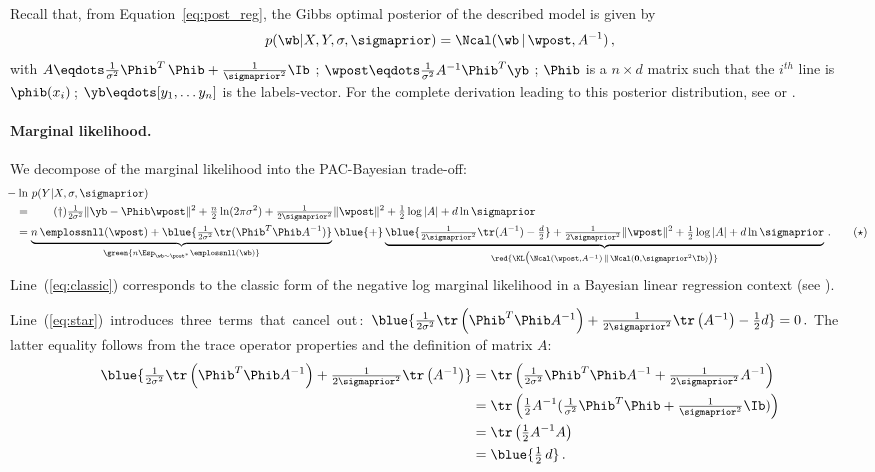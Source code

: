 \documentclass{article}
\theoremstyle{definition}
\theoremstyle{plain}
\newcommand{\citetA}{\citet}
\begin{document}
%
Recall that, from Equation~\eqref{eq:post_reg}, the Gibbs optimal posterior of the described model is given by 
$$p(\wb|X,Y,\sigma, \sigmaprior)  =\Ncal(\wb\,|\,\wpost, A^{-1})\,,$$
with
$A\eqdots\frac1{\sigma^2}\Phib^T\,\Phib+\frac1{\sigmaprior^2}\Ib$
;  $\wpost\eqdots\frac1{\sigma^2}A^{-1}\Phib^T \yb$ 
;  $\Phib$ is a $n{\times} d$ matrix such that the $i^{th}$ line is~$\phib(x_i)$\,; 
$\yb \eqdots [y_1, \ldots y_n]$ is the labels-vector. For the complete derivation leading to this posterior distribution, see \citet[Section~3.3]{bishop-2006} or \citetA[Section~2.1.1]{rasmussen-06-book}. 
 
 \paragraph{Marginal likelihood.}
 We decompose of the marginal likelihood into the PAC-Bayesian trade-off:
\begin{align}
&\!\!\!\!-\ln \,p(Y|X,\sigma, \sigmaprior) \nonumber \\ 
%
&\ = \tag{$\dagger$}\label{eq:classic}
\tfrac1{2\sigma^2}\|\yb-\Phib\wpost\|^2
+\tfrac n 2\ln(2\pi \sigma^2)
+ 
\tfrac1{2\sigmaprior^2}\|\wpost\|^2
+ \tfrac12 \log|A|
+ d\ln\sigmaprior \\
&\ =
\underbrace{
	n\,\emplossnll(\wpost)
	+   \blue{  \tfrac{1}{2 \sigma^2}  \tr ( \Phib^T \Phib A^{-1}) }
}_{\green{n\Esp_{\wb\sim\post^*}\emplossnll(\wb)} }
\blue{+} 
\underbrace{
	\blue{\tfrac1{2\sigmaprior^2}\tr(A^{-1})
	- \tfrac d2}
	+ \tfrac1{2\sigmaprior^2}\|\wpost\|^2
	+ \tfrac12 \log|A|
	+ d\ln\sigmaprior 
}_{\red{\KL\big(\Ncal(\wpost,A^{-1})\,\|\,\Ncal(\mathbf{0},\sigmaprior^2\Ib)\big)}}\,.
\tag{$\star$} 
\label{eq:star}
\end{align}
Line~(\ref*{eq:classic}) corresponds to the classic form of the negative log marginal likelihood in a Bayesian linear regression context (see \citet[Equation 3.86]{bishop-2006}).

\mbox{Line~(\ref*{eq:star}) introduces three terms that cancel out\,: 
%
$\blue{\tfrac{1}{2 \sigma^2}  \tr \left( \Phib^T \Phib A^{-1}\right) + \tfrac1{2\sigmaprior^2} \tr\left(A^{-1}\right) - \tfrac 12 d} = 0\,.$}
%
The latter equality follows from the trace operator properties and the definition of matrix $A$:
\begin{align*}
\blue{\tfrac{1}{2 \sigma^2}  \tr \left( \Phib^T \Phib A^{-1}\right) + \tfrac1{2\sigmaprior^2} \tr\left(A^{-1}\right) }
&=  \tr \left( \tfrac{1}{2 \sigma^2} \Phib^T \Phib A^{-1} + \tfrac1{2\sigmaprior^2} A^{-1}\right) \\
& =  \tr \left( \tfrac12 A^{-1} ( \tfrac{1}{ \sigma^2} \Phib^T \Phib +\tfrac1{\sigmaprior^2}\Ib)\right) \\
& =  \tr \left( \tfrac12 A^{-1} A \right)\\
& = \blue{\tfrac 12\, d} \,.
\end{align*}		
\end{document}
